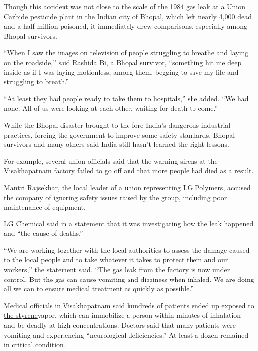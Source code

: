Though this accident was not close to the scale of the 1984 gas leak at
a Union Carbide pesticide plant in the Indian city of Bhopal, which left
nearly 4,000 dead and a half million poisoned, it immediately drew
comparisons, especially among Bhopal survivors.

``When I saw the images on television of people struggling to breathe
and laying on the roadside,'' said Rashida Bi, a Bhopal survivor,
``something hit me deep inside as if I was laying motionless, among
them, begging to save my life and struggling to breath.''

``At least they had people ready to take them to hospitals,'' she added.
``We had none. All of us were looking at each other, waiting for death
to come.''

While the Bhopal disaster brought to the fore India's dangerous
industrial practices, forcing the government to improve some safety
standards, Bhopal survivors and many others said India still hasn't
learned the right lessons.

For example, several union officials said that the warning sirens at the
Visakhapatnam factory failed to go off and that more people had died as
a result.

Mantri Rajsekhar, the local leader of a union representing LG Polymers,
accused the company of ignoring safety issues raised by the group,
including poor maintenance of equipment.

LG Chemical said in a statement that it was investigating how the leak
happened and ``the cause of deaths.''

``We are working together with the local authorities to assess the
damage caused to the local people and to take whatever it takes to
protect them and our workers,'' the statement said. ``The gas leak from
the factory is now under control. But the gas can cause vomiting and
dizziness when inhaled. We are doing all we can to ensure medical
treatment as quickly as possible.''

Medical officials in Visakhapatnam
\href{https://mumbaimirror.indiatimes.com/news/india/three-dead-many-trapped-in-houses-after-chemical-leaked-from-polymers-firm-in-visakhapatnam/articleshow/75590150.cms}{said
hundreds of patients ended up exposed to the styrene}vapor, which can
immobilize a person within minutes of inhalation and be deadly at high
concentrations. Doctors said that many patients were vomiting and
experiencing ``neurological deficiencies.'' At least a dozen remained in
critical condition.

